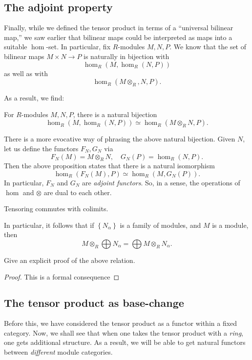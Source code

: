 \subsection{The adjoint property}
Finally, while we defined the tensor product in terms of a ``universal
bilinear map,'' we saw earlier that bilinear maps could be interpreted as maps
into a suitable $\hom$-set. 
In particular, fix $R$-modules $M,N,P$. We know that the set of bilinear maps
$M \times N \to P$ is naturally in bijection with
\[ \hom_R(M, \hom_R(N,P))  \]
as well as with
\[ \hom_R(M \otimes_R, N, P).  \]

As a result, we find:
\begin{proposition} For $R$-modules $M,N,P$, there is a natural bijection
\[ \hom_R(M,\hom_R(N,P)) \simeq \hom_R(M \otimes_R N, P).   \]
\end{proposition} 

There is a more evocative way of phrasing the above natural bijection. Given
$N$, let us define the functors $F_N, G_N$ via
\[ F_N(M) = M \otimes_R N, \quad G_N(P) = \hom_R(N,P).  \]
Then the above proposition states that there is a natural isomorphism
\[ \hom_R( F_N(M), P) \simeq \hom_R( M, G_N(P)).  \]
In particular, $F_N$ and $G_N$ are \emph{adjoint functors}. So, in a sense,
the operations of $\hom$ and $\otimes$ are dual to each other.

\begin{proposition} 
Tensoring commutes with colimits.
\end{proposition}

In particular, it follows that if $\left\{N_\alpha\right\}$ is a family of
modules, and $M$ is a module, then
\[ M \otimes_R \bigoplus N_\alpha = \bigoplus M \otimes_R N_\alpha.  \]
\begin{exercise} 
Give an explicit proof of the above relation. 
\end{exercise} 

\begin{proof} 
This is a formal consequence
\end{proof} 

\subsection{The tensor product as base-change}

Before this, we have considered the tensor product as a functor within a
fixed category. Now, we shall see that when one takes the tensor product with a
\emph{ring}, one gets additional structure. As a result, we will be able to
get natural functors between  \emph{different} module categories.

